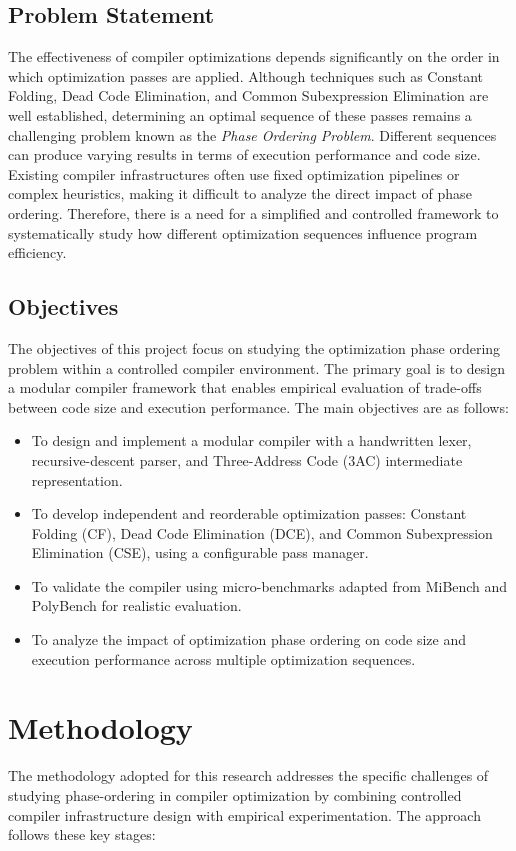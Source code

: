 \documentclass[conference]{IEEEtran}
\begin{document}
\subsection{Problem Statement}
The effectiveness of compiler optimizations depends significantly on the order in which optimization passes are applied. Although techniques such as Constant Folding, Dead Code Elimination, and Common Subexpression Elimination are well established, determining an optimal sequence of these passes remains a challenging problem known as the \textit{Phase Ordering Problem}. Different sequences can produce varying results in terms of execution performance and code size. Existing compiler infrastructures often use fixed optimization pipelines or complex heuristics, making it difficult to analyze the direct impact of phase ordering. Therefore, there is a need for a simplified and controlled framework to systematically study how different optimization sequences influence program efficiency.

\subsection{Objectives}
The objectives of this project focus on studying the optimization phase ordering problem within a controlled compiler environment. The primary goal is to design a modular compiler framework that enables empirical evaluation of trade-offs between code size and execution performance. The main objectives are as follows:
\begin{itemize}
    \item To design and implement a modular compiler with a handwritten lexer, recursive-descent parser, and Three-Address Code (3AC) intermediate representation.
    \item To develop independent and reorderable optimization passes: Constant Folding (CF), Dead Code Elimination (DCE), and Common Subexpression Elimination (CSE), using a configurable pass manager.
    \item To validate the compiler using micro-benchmarks adapted from MiBench and PolyBench for realistic evaluation.
    \item To analyze the impact of optimization phase ordering on code size and execution performance across multiple optimization sequences.
\end{itemize}

\section{Methodology}
The methodology adopted for this research addresses the specific challenges of studying phase-ordering in compiler optimization by combining controlled compiler infrastructure design with empirical experimentation. The approach follows these key stages:
\end{document}

